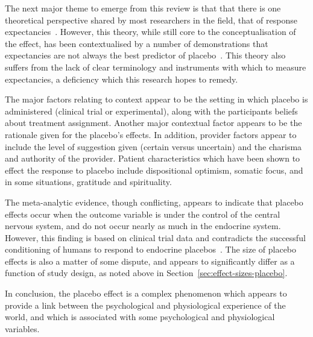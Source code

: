 The next major theme to emerge from this review is that that there is one theoretical perspective shared by most researchers in the field, that of response expectancies~\cite{Kirsch1997,Kirsch1985}. However, this theory, while still core to the conceptualisation of the effect, has been contextualised by a number of demonstrations that expectancies are not always the best predictor of placebo~\cite{Hyland2006,Geers2005a}. This theory also suffers from the lack of clear terminology and instruments with which to measure expectancies, a deficiency which this research hopes to remedy. 

The major factors relating to context appear to be the setting in which placebo is administered (clinical trial or experimental), along with the participants beliefs about treatment assignment. Another major contextual factor appears to be the rationale given for the placebo's effects.  In addition, provider factors appear to include the level of suggestion given (certain versus uncertain) and the charisma and authority of the provider. Patient characteristics which have been shown to effect the response to placebo include dispositional optimism, somatic focus, and in some situations, gratitude and spirituality.  



The meta-analytic evidence, though conflicting, appears to indicate that placebo effects occur when the outcome variable is under the control of the central nervous system, and do not occur nearly as much in the endocrine system. However, this finding is based on clinical trial data and contradicts the successful conditioning of humans to respond to endocrine placebos~\cite{benedetti2003a}. The size of placebo effects is also a matter of some dispute, and appears to significantly differ as a function of study design, as noted above in Section~\ref{sec:effect-sizes-placebo}. 

In conclusion, the placebo effect is a complex phenomenon which appears to provide a link between the psychological and physiological  experience of the world, and which is associated  with some psychological and physiological variables. 

